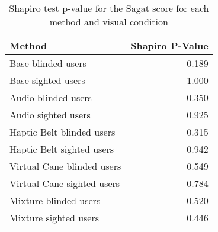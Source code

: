 
\begin{table}[!htb]
\centering
\caption{Shapiro test p-value for the Sagat score for each method and visual condition}
\label{tab:shapiro_sagat_score}
\begin{tabular}{lr}
\toprule
                    Method &  Shapiro P-Value \\
\midrule
        Base blinded users &            0.189 \\
        Base sighted users &            1.000 \\
       Audio blinded users &            0.350 \\
       Audio sighted users &            0.925 \\
 Haptic Belt blinded users &            0.315 \\
 Haptic Belt sighted users &            0.942 \\
Virtual Cane blinded users &            0.549 \\
Virtual Cane sighted users &            0.784 \\
     Mixture blinded users &            0.520 \\
     Mixture sighted users &            0.446 \\
\bottomrule
\end{tabular}
\end{table}

